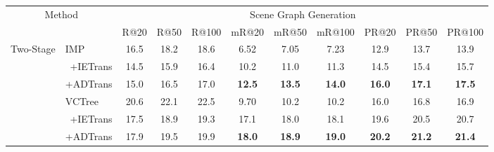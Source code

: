 \documentclass[letterpaper]{article} %
\begin{document}
\begin{table}[]
\tabcolsep=0.08cm

\begin{tabular}{cr|ccccccccc}
\hline
\multicolumn{2}{c|}{\multirow{2}{*}{Method}}                                      & \multicolumn{9}{c}{Scene Graph Generation}                                                                                                                    \\ \cline{3-11} 
\multicolumn{2}{c|}{}                                                             & R@20 & R@50 & \multicolumn{1}{c|}{R@100} & mR@20         & mR@50         & \multicolumn{1}{c|}{mR@100}        & PR@20         & PR@50         & PR@100        \\ \hline
\multicolumn{1}{c|}{\multirow{12}{*}{Two-Stage}} & \multicolumn{1}{l|}{IMP \cite{Xu_2017_CVPR}}       & 16.5 & 18.2 & \multicolumn{1}{c|}{18.6}  & 6.52          & 7.05          & \multicolumn{1}{c|}{7.23}          & 12.9          & 13.7          & 13.9          \\
\multicolumn{1}{c|}{}                            &  \quad +IETrans \cite{zhang2022fine}                      & 14.5 & 15.9 & \multicolumn{1}{c|}{16.4}  & 10.2          & 11.0          & \multicolumn{1}{c|}{11.3}          & 14.5          & 15.4          & 15.7          \\
\multicolumn{1}{c|}{}                            &  \multicolumn{1}{l|}{\quad +ADTrans }                    & 15.0 & 16.5 & \multicolumn{1}{c|}{17.0}  & \textbf{12.5} & \textbf{13.5} & \multicolumn{1}{c|}{\textbf{14.0}} & \textbf{16.0} & \textbf{17.1} & \textbf{17.5} \\ \cline{2-11} 
\multicolumn{1}{c|}{}                            & \multicolumn{1}{l|}{VCTree \cite{Tang_2019_CVPR}}    & 20.6 & 22.1 & \multicolumn{1}{c|}{22.5}  & 9.70          & 10.2          & \multicolumn{1}{c|}{10.2}          & 16.0          & 16.8          & 16.9          \\
\multicolumn{1}{c|}{}                            & \quad +IETrans \cite{zhang2022fine}                      & 17.5 & 18.9 & \multicolumn{1}{c|}{19.3}  & 17.1          & 18.0          & \multicolumn{1}{c|}{18.1}          & 19.6          & 20.5          & 20.7          \\
\multicolumn{1}{c|}{}                            & \multicolumn{1}{l|}{\quad +ADTrans }                        & 17.9 & 19.5 & \multicolumn{1}{c|}{19.9}  & \textbf{18.0} & \textbf{18.9} & \multicolumn{1}{c|}{\textbf{19.0}} & \textbf{20.2} & \textbf{21.2} & \textbf{21.4} \\ \cline{2-11} 

\end{tabular}
\end{table}
\end{document}
